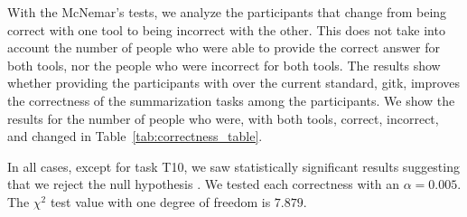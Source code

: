 With the McNemar's tests, we analyze the participants that change from
being correct with one tool to being incorrect with the other.  This does
not take into account the number of people who were able to provide the
correct answer for both tools, nor the people who were incorrect for both
tools.  The results show whether providing the participants with \tool
over the current standard, gitk, improves the correctness of the
summarization tasks among the participants.  We show the results for the
number of people who were, with both tools, correct, incorrect, and
changed in Table~\ref{tab:correctness_table}.

In all cases, except for task T10,  we saw statistically significant
results  suggesting that we reject the null hypothesis .  We tested each
correctness with an $\alpha = 0.005$. The $\chi^2$ test value with one
degree of freedom is $7.879$.

